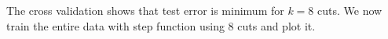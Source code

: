 \documentclass[10pt]{article}
\begin{document}
The cross validation shows that test error is minimum for $k=8$ cuts. We now train the entire data with step function using $8$ cuts and plot it.
\end{document}
